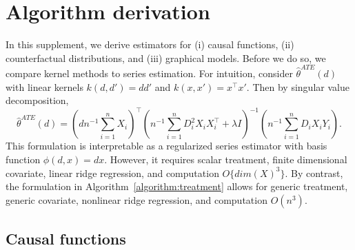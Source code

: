 \section{Algorithm derivation}\label{sec:derivation}

In this supplement, we derive estimators for (i) causal functions, (ii) counterfactual distributions, and (iii) graphical models. Before we do so, we compare kernel methods to series estimation. For intuition, consider $\hat{\theta}^{ATE}(d)$ with linear kernels $k(d,d')=d d'$ and $k(x,x')=x^{\top}x'$. Then by singular value decomposition,
$$
\hat{\theta}^{ATE}(d)=\left(d n^{-1}\sum_{i=1}^nX_i\right)^{\top}\left(n^{-1}\sum_{i=1}^n D_i^2X_iX_i^{\top}+\lambda  I \right)^{-1}\left(n^{-1}\sum_{i=1}^n D_iX_i Y_i\right).
$$
This formulation is interpretable as a regularized series estimator with basis function $\phi(d,x)=dx$. However, it requires scalar treatment, finite dimensional covariate, linear ridge regression, and computation $O\{dim(X)^3\}$. By contrast, the formulation in Algorithm~\ref{algorithm:treatment} allows for generic treatment, generic covariate, nonlinear ridge regression, and computation $O(n^3)$.


\subsection{Causal functions}

